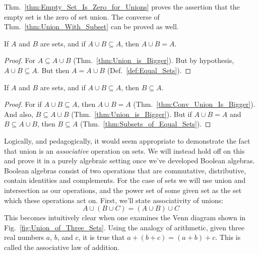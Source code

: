         Thm.~\ref{thm:Empty_Set_Is_Zero_for_Unions} proves the assertion that
        the empty set is the zero of set union. The converse of
        Thm.~\ref{thm:Union_With_Subset} can be proved as well.
        \begin{theorem}
            \label{thm:Conv_Union_Is_Bigger}%
            If $A$ and $B$ are sets, and if $A\cup{B}\subseteq{A}$, then
            $A\cup{B}=A$.
        \end{theorem}
        \begin{proof}
            For $A\subseteq{A}\cup{B}$ (Thm.~\ref{thm:Union_is_Bigger}). But by
            hypothesis, $A\cup{B}\subseteq{A}$. But then $A=A\cup{B}$
            (Def.~\ref{def:Equal_Sets}).
        \end{proof}
        \begin{theorem}
            \label{thm:Union_is_Equal}%
            If $A$ and $B$ are sets, and if $A\cup{B}\subseteq{A}$, then
            $B\subseteq{A}$.
        \end{theorem}
        \begin{proof}
            For if $A\cup{B}\subseteq{A}$, then $A\cup{B}=A$
            (Thm.~\ref{thm:Conv_Union_Is_Bigger}). And also,
            $B\subseteq{A}\cup{B}$ (Thm.~\ref{thm:Union_is_Bigger}). But if
            $A\cup{B}=A$ and $B\subseteq{A}\cup{B}$, then $B\subseteq{A}$
            (Thm.~\ref{thm:Subsets_of_Equal_Sets}).
        \end{proof}
        Logically, and pedagogically, it would seem appropriate to demonstrate
        the fact that union is an \textit{associative} operation on sets. We
        will instead hold off on this and prove it in a purely algebraic setting
        once we've developed Boolean algebras. Boolean algebras consist of two
        operations that are commutative, distributive, contain identities and
        complements. For the case of sets we will use union and intersection as
        our operations, and the power set of some given set as the set which
        these operations act on. First, we'll state associativity of unions:
        \begin{equation}
            A\cup(B\cup{C})=(A\cup{B})\cup{C}
        \end{equation}
        This becomes intuitively clear when one examines the Venn diagram
        shown in Fig.~\ref{fig:Union_of_Three_Sets}. Using the analogy of
        arithmetic, given three real numbers $a$, $b$, and $c$, it is true that
        $a+(b+c)=(a+b)+c$. This is called the associative law of addition.
